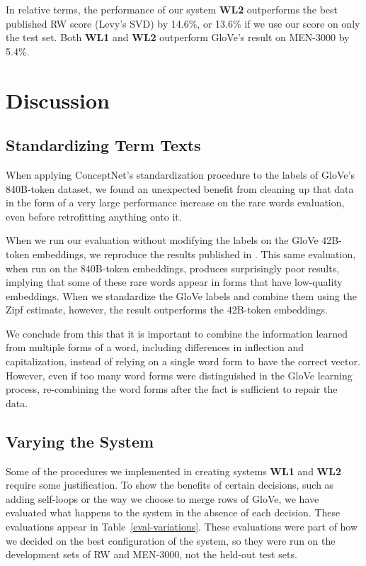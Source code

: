 \documentclass[letterpaper]{article}
\begin{document}
In relative terms, the performance of our system {\bf WL2} outperforms the best
published RW score (Levy's SVD) by 14.6\%, or 13.6\% if we use our score on only
the test set. Both {\bf WL1} and {\bf WL2} outperform GloVe's result on
MEN-3000 by 5.4\%.

\section{Discussion}

\subsection{Standardizing Term Texts}

When applying ConceptNet's standardization procedure to the labels of GloVe's
840B-token dataset, we found an unexpected benefit from cleaning up that data in
the form of a very large performance increase on the rare words evaluation,
even before retrofitting anything onto it.

When we run our evaluation without modifying the labels on the GloVe 42B-token
embeddings, we reproduce the results published in \cite{pennington2014glove}.
This same evaluation, when run on the 840B-token embeddings, produces
surprisingly poor results, implying that some of these rare words appear in
forms that have low-quality embeddings. When we standardize the GloVe labels and
combine them using the Zipf estimate, however, the result outperforms the
42B-token embeddings.

We conclude from this that it is important to combine the information learned
from multiple forms of a word, including differences in inflection and
capitalization, instead of relying on a single word form to have the correct
vector. However, even if too many word forms were distinguished in the GloVe
learning process, re-combining the word forms after the fact is sufficient to
repair the data.

\subsection{Varying the System}

Some of the procedures we implemented in creating systems {\bf WL1} and
{\bf WL2} require some justification. To show the benefits of certain decisions,
such as adding self-loops or the way we choose to merge rows of GloVe, we have
evaluated what happens to the system in the absence of each decision. These
evaluations appear in Table~\ref{eval-variations}. These evaluations were
part of how we decided on the best configuration of the system, so they were
run on the development sets of RW and MEN-3000, not the held-out test sets.
\end{document}
